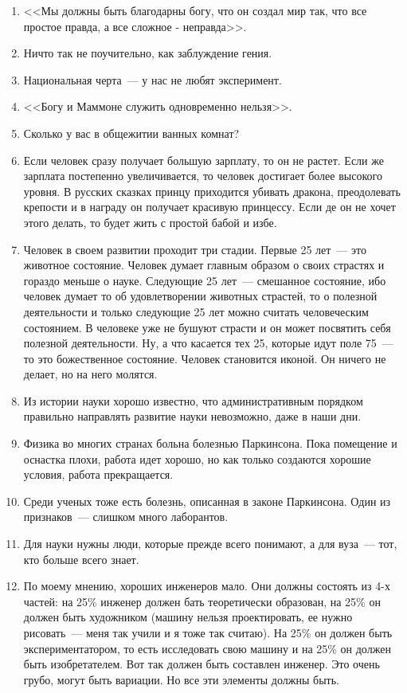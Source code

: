 \documentclass[12pt,a4paper,titlepage]{article}
\begin{document}
\begin{enumerate}
\item <<Мы должны быть благодарны богу, что он создал мир так, что все простое правда, а все сложное - неправда>>.
\item Ничто так не поучительно, как заблуждение гения.
\item Национальная черта~--- у нас не любят эксперимент.
\item <<Богу и Маммоне служить одновременно нельзя>>.
\item Сколько у вас в общежитии ванных комнат?
\item Если человек сразу получает большую зарплату, то он не растет. Если же зарплата постепенно увеличивается, то человек достигает более высокого уровня. В русских сказках принцу приходится убивать дракона, преодолевать крепости и в награду он получает красивую принцессу. Если де он не хочет этого делать, то будет жить с простой бабой и избе.
\item Человек в своем развитии проходит три стадии. Первые 25 лет~--- это животное состояние. Человек думает главным образом о своих страстях и гораздо меньше о науке. Следующие 25 лет~--- смешанное состояние, ибо человек думает то об удовлетворении животных страстей, то о полезной деятельности и только следующие 25 лет можно считать человеческим состоянием. В человеке уже не бушуют страсти и он может посвятить себя полезной деятельности. Ну, а что касается тех 25, которые идут поле 75~--- то это божественное состояние. Человек становится иконой. Он ничего не делает, но на него молятся.
\item Из истории науки хорошо известно, что административным порядком правильно направлять развитие науки невозможно, даже в наши дни.
\item Физика во многих странах больна болезнью Паркинсона. Пока помещение и оснастка плохи, работа идет хорошо, но как только создаются хорошие условия, работа прекращается.
\item Среди ученых тоже есть болезнь, описанная в законе Паркинсона. Один из признаков~--- слишком много лаборантов.
\item Для науки нужны люди, которые прежде всего понимают, а для вуза~--- тот, кто больше всего знает.
\item По моему мнению, хороших инженеров мало. Они должны состоять из 4-х частей: на 25\% инженер должен бать теоретически образован, на 25\% он должен быть художником (машину нельзя проектировать, ее нужно рисовать~--- меня так учили и я тоже так считаю). На 25\% он должен быть экспериментатором, то есть исследовать свою машину и на 25\% он должен быть изобретателем. Вот так должен быть составлен инженер. Это очень грубо, могут быть вариации. Но все эти элементы должны быть.

\end{enumerate}
\end{document}
